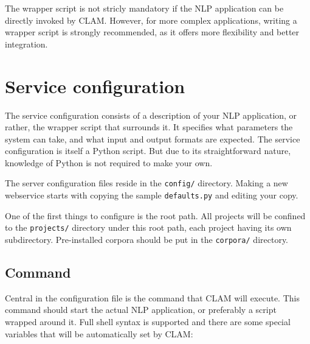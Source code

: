 \documentclass[a4paper,12pt]{report}
\begin{document}
The wrapper script is not stricly mandatory if the NLP application can be directly invoked by CLAM. However, for more complex applications, writing a wrapper script is strongly recommended, as it offers more flexibility and better integration.

\section{Service configuration}

The service configuration consists of a description of your NLP application, or rather, the wrapper script that surrounds it. It specifies what parameters the system can take, and what input and output formats are expected. The service configuration is itself a Python script. But due to its straightforward nature, knowledge of Python is not required to make your own.

The server configuration files reside in the \texttt{config/} directory. Making a new webservice starts with copying the sample \texttt{defaults.py} and editing your copy.

One of the first things to configure is the root path. All projects will be confined to the \texttt{projects/} directory under this root path, each project having its own subdirectory. Pre-installed corpora should be put in the \texttt{corpora/} directory.
 
\subsection{Command}
\label{sec:command}

Central in the configuration file is the command that CLAM will execute. This command should start the actual NLP application, or preferably a script wrapped around it. Full shell syntax is supported and there are some special variables that will be automatically set by CLAM:
\end{document}
